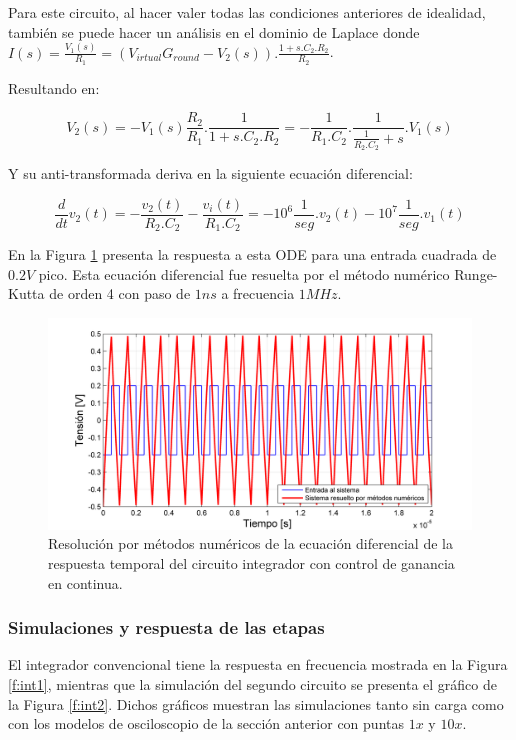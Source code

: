 Para este circuito, al hacer valer todas las condiciones anteriores de idealidad, también se puede hacer un análisis en el dominio de Laplace donde $ I(s) = \frac{V_1(s)}{R_1} = (V_{irtual}G_{round}-V_2(s)).\frac{1+s.C_2.R_2}{R_2}$.

Resultando en:

\begin{equation}
V_2(s) = - V_1(s) \frac{R_2}{R_1}.\frac{1}{1+s.C_2.R_2} = -\frac{1}{R_1.C_2}.\frac{1}{\frac{1}{R_2.C_2}+s} . V_1(s)
\end{equation}

Y su anti-transformada deriva en la siguiente ecuación diferencial:

\begin{equation}
\frac{d}{dt}v_2(t) = -\frac{v_2(t)}{R_2.C_2} -\frac{v_i(t)}{R_1.C_2} = -10^6\frac{1}{seg}.v_2(t) -10^7\frac{1}{seg}.v_1(t)
\end{equation}

En la Figura \ref{t:int2_RK4} presenta la respuesta a esta ODE para una entrada cuadrada de $0.2V$ pico. Esta ecuación diferencial fue resuelta por el método numérico Runge-Kutta de orden 4 con paso de $1ns$ a frecuencia $1MHz$.


\begin{figure}[H]
  \centering
\includegraphics[width=.8\textwidth]{gfx_22/t_AMP2_RK4}
  \caption{Resolución por métodos numéricos de la ecuación diferencial de la respuesta temporal del circuito integrador con control de ganancia en continua.}
  \label{t:int2_RK4}
\end{figure}



\subsubsection{Simulaciones y respuesta de las etapas}

El integrador convencional tiene la respuesta en frecuencia mostrada en la Figura \ref{f:int1}, mientras que la simulación del segundo circuito se presenta el gráfico de la Figura \ref{f:int2}. Dichos gráficos muestran las simulaciones tanto sin carga como con los modelos de osciloscopio de la sección anterior con puntas $1x$ y $10x$.

